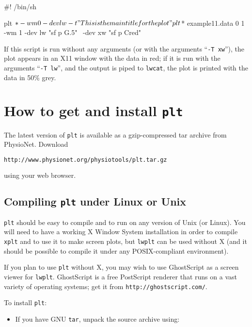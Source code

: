 \documentclass{book}
\begin{document}
\begin{center}
\begin{boxedverbatim}
#! /bin/sh

plt $* -wm 0 -dev lw -t "This is the main title for the plot"
plt $* example11.data 0 1 -wm 1 -dev lw "sf p G.5" \
 -dev xw "sf p Cred"
\end{boxedverbatim}
\end{center}

%
If this script is run without any arguments (or with the arguments
``{\tt -T xw}''), the plot appears in an X11 window with the data
in red;  if it is run with the arguments ``{\tt -T lw}'', and the
output is piped to {\tt lwcat}, the plot is printed with the data
in 50\% grey.

\chapter{How to get and install {\tt plt} \label{sec:distribution}}

The latest version of {\tt plt} is available as a gzip-compressed tar
archive from PhysioNet.  Download
\begin{center}
{\tt http://www.physionet.org/physiotools/plt.tar.gz}
\end{center}
using your web browser.

\section{Compiling {\tt plt} under Linux or Unix \label{sec:unix}}

%
%
%
{\tt plt} should be easy to compile and to run on any version of Unix
(or Linux).  You will need to have a working X Window System
installation in order to compile {\tt xplt} and to use it to make
screen plots, but {\tt lwplt} can be used without X (and it should be
possible to compile it under any POSIX-compliant environment).

%
If you plan to use {\tt plt} without X, you may wish to use
GhostScript as a screen viewer for {\tt lwplt}. GhostScript is a
free PostScript renderer that runs on a vast variety of operating systems;
get it from {\tt http://ghostscript.com/}.

To install {\tt plt}:

\begin{itemize}
\item
If you have GNU {\tt tar}, unpack the source archive using:
\end{itemize}
\end{document}
